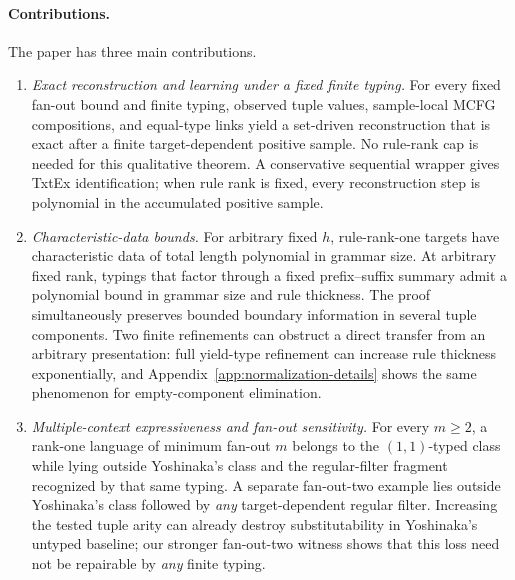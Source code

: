 \documentclass[11pt]{article}
\numberwithin{equation}{section}
\theoremstyle{plain}
\theoremstyle{definition}
\theoremstyle{remark}
\begin{document}
\paragraph{Contributions.}
The paper has three main contributions.
\begin{enumerate}[label=\textup{(\arabic*)},leftmargin=2.4em]
\item \emph{Exact reconstruction and learning under a fixed finite typing.}
For every fixed fan-out bound and finite typing, observed tuple values,
sample-local MCFG compositions, and equal-type links yield a set-driven
reconstruction that is exact after a finite target-dependent positive sample.
No rule-rank cap is needed for this qualitative theorem.  A conservative
sequential wrapper gives TxtEx identification; when rule rank is fixed, every
reconstruction step is polynomial in the accumulated positive sample.
\item \emph{Characteristic-data bounds.}
For arbitrary fixed $h$, rule-rank-one targets have characteristic data of
total length polynomial in grammar size.  At arbitrary fixed rank, typings
that factor through a fixed prefix--suffix summary admit a polynomial bound in
grammar size and rule thickness.  The proof simultaneously preserves bounded
boundary information in several tuple components.  Two finite refinements can
obstruct a direct transfer from an arbitrary presentation: full yield-type
refinement can increase rule thickness exponentially, and Appendix~\ref{app:normalization-details}
shows the same phenomenon for empty-component elimination.
\item \emph{Multiple-context expressiveness and fan-out sensitivity.}
For every $m\ge2$, a rank-one language of minimum fan-out $m$ belongs to the
$(1,1)$-typed class while lying outside Yoshinaka's class and the regular-filter
fragment recognized by that same typing.  A separate fan-out-two example lies
outside Yoshinaka's class followed by \emph{any} target-dependent regular
filter.  Increasing the tested tuple arity can already destroy substitutability
in Yoshinaka's untyped baseline; our stronger fan-out-two witness shows that
this loss need not be repairable by \emph{any} finite typing.
\end{enumerate}
\end{document}

